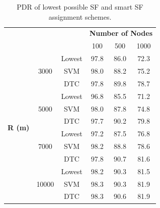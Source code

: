 \documentclass[conference]{IEEEtran}
\begin{document}
\begin{table}
\centering
\caption{PDR of lowest possible SF and smart SF assignment schemes.}
\label{table:prediction_pdr}
\begin{tabular}{|c|c|c|c|c|c|}
\hline
\multicolumn{3}{|c|}{\multirow{2}{*}{}}                            & \multicolumn{3}{c|}{\textbf{Number of Nodes}} \\ \cline{4-6}
\multicolumn{3}{|c|}{}                                             & 100           & 500           & 1000          \\ \hline
\multirow{12}{*}{\textbf{R (m)}} & \multirow{3}{*}{3000}  & Lowest & 97.8          & 86.0          & 72.3          \\ \cline{3-6}
                                 &                        & SVM    & 98.0          & 88.2          & 75.2          \\ \cline{3-6}
                                 &                        & DTC    & 97.8          & 89.8          & 78.7          \\ \cline{2-6}

                                 & \multirow{3}{*}{5000}  & Lowest & 96.8          & 85.5          & 71.2          \\ \cline{3-6}
                                 &                        & SVM    & 98.0          & 87.8          & 74.8          \\ \cline{3-6}
                                 &                        & DTC    & 97.7          & 90.2          & 79.8          \\ \cline{2-6}

                                 & \multirow{3}{*}{7000}  & Lowest & 97.2          & 87.5          & 76.8          \\ \cline{3-6}
                                 &                        & SVM    & 98.2          & 88.8          & 78.6          \\ \cline{3-6}
                                 &                        & DTC    & 97.8          & 90.7          & 81.6          \\ \cline{2-6}

                                 & \multirow{3}{*}{10000} & Lowest & 98.2          & 90.3          & 81.5          \\ \cline{3-6}
                                 &                        & SVM    & 98.3          & 90.3          & 81.9          \\ \cline{3-6}
                                 &                        & DTC    & 98.3          & 90.6          & 81.9          \\ \hline
\end{tabular}
\end{table}
\end{document}
